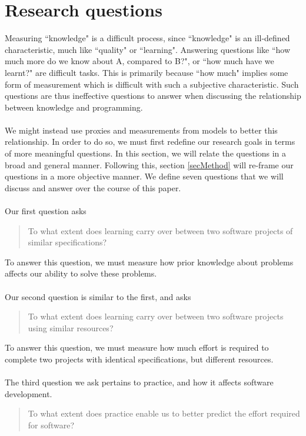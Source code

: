 \section{Research questions} \label{secMotivation}

Measuring ``knowledge" is a difficult process, since ``knowledge" is an
ill-defined characteristic, much like ``quality" or ``learning".
Answering questions like ``how much more do we know about A, compared to B?", or
``how much have we learnt?" are difficult tasks.
This is primarily because ``how much" implies some form of measurement which is
difficult with such a subjective characteristic.
Such questions are thus ineffective questions to answer when discussing the
relationship between knowledge and programming.\\
\\
We might instead use proxies and measurements from models to better this
relationship.
In order to do so, we must first redefine our research goals in terms of more
meaningful questions.
In this section, we will relate the questions in a broad and general manner.
Following this, section \ref{secMethod} will re-frame our questions in a more
objective manner.
We define seven questions that we will discuss and answer over the course of
this paper.\\
\\
Our first question asks
\begin{quote}
  To what extent does learning carry over between two software projects of similar
  specifications?
\end{quote}
To answer this question, we must measure how prior knowledge about problems affects
our ability to solve these problems.\\
\\
Our second question is similar to the first, and asks
\begin{quote}
  To what extent does learning carry over between two software projects using
  similar resources?
\end{quote}
To answer this question, we must measure how much effort is required to complete
two projects with identical specifications, but different resources.\\
\\
The third question we ask pertains to practice, and how it affects software
development.
\begin{quote}
  To what extent does practice enable us to better predict the effort required
  for software?
\end{quote}
